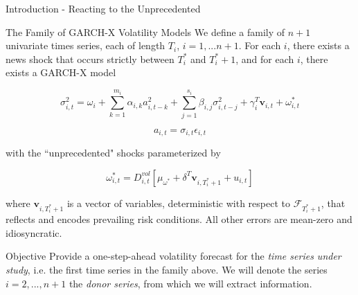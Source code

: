 \documentclass{beamer} %
\newcommand{\x}{\textbf{v}}
\begin{document}
\begin{frame}[t]
\begin{columns}[t]
\begin{column}{0.465\textwidth}
\begin{block}{Introduction - Reacting to the Unprecedented}
\end{block}

            
\begin{block}{The Family of GARCH-X Volatility Models}
	We define a family of $n+1$ univariate times series, each of length $T_{i}$, $i=1,...n+1$.  For each $i$, there exists a news shock that occurs strictly between $T^{*}_{i}$ and $T^{*}_{i}+1$, and for each $i$, there exists a GARCH-X model

	\bigskip %




			  \begin{equation} \sigma^{2}_{i,t} = \omega_{i} + \sum^{m_{i}}_{k=1}\alpha_{i,k}a^{2}_{i,t-k} + \sum_{j=1}^{s_{i}}\beta_{i,j}\sigma_{i,t-j}^{2} + \gamma_{i}^{T} \x_{i,t} + \omega^{*}_{i,t}
			  \end{equation}
		  
			  \begin{equation}a_{i,t} = \sigma_{i,t}\epsilon_{i,t} 
			  \end{equation}

with the ``unprecedented" shocks parameterized by

\begin{equation}\omega_{i,t}^{*} = D^{vol}_{i,t}[\mu_{\omega^{*}}+\delta^{T}\x_{i,T^{*}_{i}+1}+ u_{i,t}]
\end{equation}

where $\x_{i,T^{*}_{i}+1}$ is a vector of variables, deterministic with respect to $\mathcal{F}_{T^{*}_{i}+1}$, that reflects and encodes prevailing risk conditions.  All other errors are mean-zero and idiosyncratic.


	\end{block}



\begin{block}{Objective}
Provide a one-step-ahead volatility forecast for the \textit{time series under study}, i.e. the first time series in the family above.  We will denote the series $i=2,...,n+1$ the \textit{donor series}, from which we will extract information.
\end{block}


\end{column}
\end{columns}
\end{frame}
\end{document}
